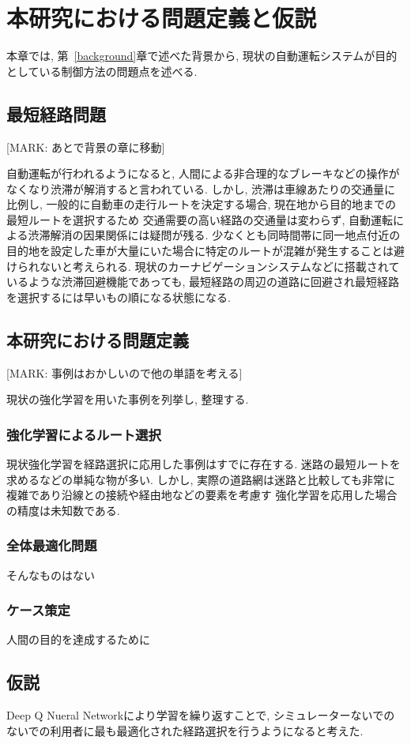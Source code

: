 \chapter{本研究における問題定義と仮説}
\label{issue}

本章では, 第~\ref{background}章で述べた背景から, 現状の自動運転システムが目的としている制御方法の問題点を述べる.

\section{最短経路問題}

[MARK: あとで背景の章に移動]

自動運転が行われるようになると, 人間による非合理的なブレーキなどの操作がなくなり渋滞が解消すると言われている.
しかし, 渋滞は車線あたりの交通量に比例し, 一般的に自動車の走行ルートを決定する場合, 現在地から目的地までの最短ルートを選択するため
交通需要の高い経路の交通量は変わらず, 自動運転による渋滞解消の因果関係には疑問が残る.
少なくとも同時間帯に同一地点付近の目的地を設定した車が大量にいた場合に特定のルートが混雑が発生することは避けられないと考えられる.
現状のカーナビゲーションシステムなどに搭載されているような渋滞回避機能であっても, 最短経路の周辺の道路に回避され最短経路を選択するには早いもの順になる状態になる.

\section{本研究における問題定義}

[MARK: 事例はおかしいので他の単語を考える]

現状の強化学習を用いた事例を列挙し, 整理する.

\subsection{強化学習によるルート選択}

現状強化学習を経路選択に応用した事例はすでに存在する.  迷路の最短ルートを求めるなどの単純な物が多い. 
しかし, 実際の道路網は迷路と比較しても非常に複雑であり沿線との接続や経由地などの要素を考慮す
強化学習を応用した場合の精度は未知数である.


\subsection{全体最適化問題}

そんなものはない


\subsection{ケース策定}

人間の目的を達成するために


\section{仮説}

Deep Q Nueral Networkにより学習を繰り返すことで, シミュレーターないでのないでの利用者に最も最適化された経路選択を行うようになると考えた.



